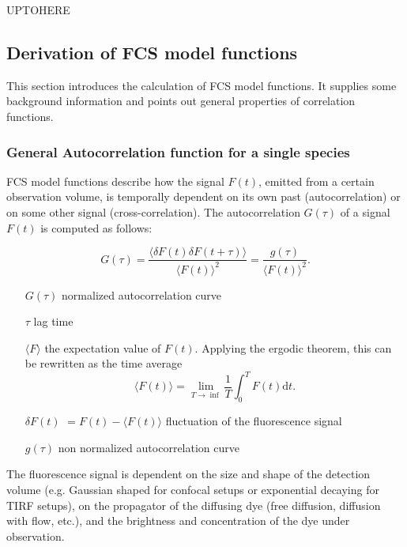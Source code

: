 UPTOHERE	
\subsection{Derivation of FCS model functions}
This section introduces the calculation of FCS model functions. It supplies some background information and points out general properties of correlation functions.
	
	\subsubsection{General Autocorrelation function for a single species}
	FCS model functions describe how the signal $F(t)$, emitted from a certain observation volume, is temporally dependent on its own past (autocorrelation) or on some other signal (cross-correlation). The autocorrelation $G(\tau)$ of a signal $F(t)$ is computed as follows:
	\newline
	\newline
	\begin{minipage}{\textwidth}
	\begin{equation}
	G(\tau) = \frac{\langle \delta F(t) \delta F(t+\tau) \rangle}{\langle F(t) \rangle^2} = \frac{g(\tau)}{\langle F(t) \rangle^2}.
	\end{equation}
	\begin{itemize} \small
	\item[$G(\tau)$] normalized autocorrelation curve
	\item[$\tau$] lag time
	\item[$\langle F \rangle$] the expectation value of $F(t)$. Applying the ergodic theorem, this can be rewritten as the time average \[ \langle F(t) \rangle = \lim_{T \rightarrow \inf }\frac{1}{T} \int_0^T F(t) \mathrm{d}t. \]	
	\item[$\delta F(t)$] $= F(t) - \langle F(t) \rangle$ fluctuation of the fluorescence signal
	\item[$g(\tau)$] non normalized autocorrelation curve
	\end{itemize}
	\end{minipage}
	\newline
	\newline
	\newline
	The fluorescence signal is dependent on the size and shape of the detection volume (e.g. Gaussian shaped for confocal setups or exponential decaying for TIRF setups), on the propagator of the diffusing dye (free diffusion, diffusion with flow, etc.), and the brightness and concentration of the dye under observation\cite{Burkhardt2010}.  \\
